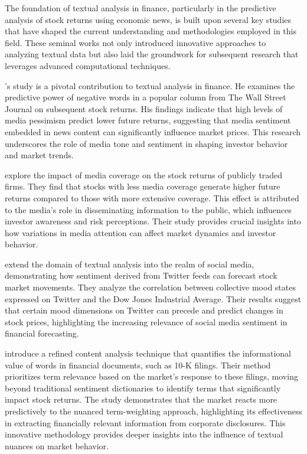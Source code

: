 The foundation of textual analysis in finance, particularly in the predictive analysis of stock returns using economic news, is built upon several key studies that have shaped the current understanding and methodologies employed in this field. These seminal works not only introduced innovative approaches to analyzing textual data but also laid the groundwork for subsequent research that leverages advanced computational techniques.

\mx
\cite{tetlock2007giving}
's study is a pivotal contribution to textual analysis in finance. He examines the predictive power of negative words in a popular column from The Wall Street Journal on subsequent stock returns. His findings indicate that high levels of media pessimism predict lower future returns, suggesting that media sentiment embedded in news content can significantly influence market prices. This research underscores the role of media tone and sentiment in shaping investor behavior and market trends.

\mx
\cite{fang2009media}
explore the impact of media coverage on the stock returns of publicly traded firms. They find that stocks with less media coverage generate higher future returns compared to those with more extensive coverage. This effect is attributed to the media's role in disseminating information to the public, which influences investor awareness and risk perceptions. Their study provides crucial insights into how variations in media attention can affect market dynamics and investor behavior.

\mx
\cite{bollen2011twitter} 
extend the domain of textual analysis into the realm of social media, demonstrating how sentiment derived from Twitter feeds can forecast stock market movements. They analyze the correlation between collective mood states expressed on Twitter and the Dow Jones Industrial Average. Their results suggest that certain mood dimensions on Twitter can precede and predict changes in stock prices, highlighting the increasing relevance of social media sentiment in financial forecasting.

\mx
\cite{jegadeesh2013word} 
introduce a refined content analysis technique that quantifies the informational value of words in financial documents, such as 10-K filings. Their method prioritizes term relevance based on the market's response to these filings, moving beyond traditional sentiment dictionaries to identify terms that significantly impact stock returns. The study demonstrates that the market reacts more predictively to the nuanced term-weighting approach, highlighting its effectiveness in extracting financially relevant information from corporate disclosures. This innovative methodology provides deeper insights into the influence of textual nuances on market behavior.

